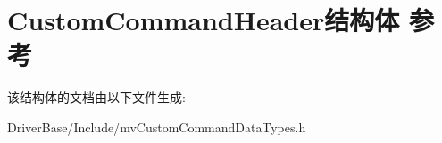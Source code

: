 \hypertarget{struct_custom_command_header}{\section{Custom\+Command\+Header结构体 参考}
\label{struct_custom_command_header}
}


该结构体的文档由以下文件生成\+:\begin{DoxyCompactItemize}
\item 
Driver\+Base/\+Include/mv\+Custom\+Command\+Data\+Types.\+h\end{DoxyCompactItemize}
